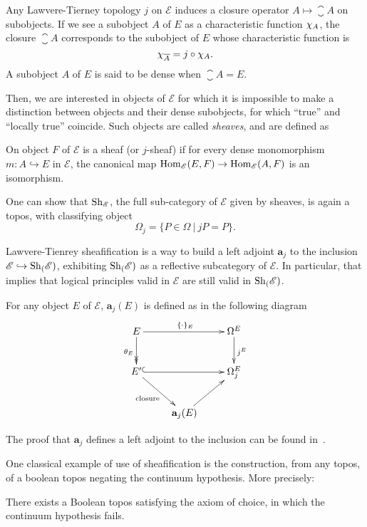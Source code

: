 Any Lawvere-Tierney topology $j$ on $\mathcal E$ induces a closure operator
$A \mapsto \closure{A}$ on subobjects. If we see a subobject $A$ of $E$
as a characteristic function $\chi_{A}$, the closure $\closure{A}$
corresponds to the subobject of $E$ whose characteristic function is 
%
\[
\chi_{\overline{A}} = j \circ \chi_{A}.
\]%
%
A subobject $A$ of $E$ is said to
be dense when $\closure{A} = E$.

Then, we are interested in objects of $\mathcal E$ for which it is
impossible to make a distinction between objects and their dense
subobjects, \ie{} for which ``true'' and ``locally true''
coincide. Such objects are called {\em sheaves}, and are defined as

\begin{defi}
  On object $F$ of $\mathcal E$ is a sheaf (or $j$-sheaf) if for every
  dense monomorphism $m: A \hookrightarrow E$ in $\mathcal E$, the
  canonical map $\mathrm{Hom}_{\mathcal E}(E,F) \rightarrow \mathrm{Hom}_{\mathcal E}(A,F)$ is an
isomorphism.
\end{defi}

One can show that $\mathrm{Sh}_{\mathcal E}$, the full sub-category of
$\mathcal E$ given by
sheaves, is again a topos, with classifying object
%
\[
\Omega_j = \{ P \in \Omega \ | \ j P  = P \}.
\]

Lawvere-Tienrey sheafification is a way to build a left adjoint $\mathbf{a}_j$ to the
inclusion $\mathcal E \hookrightarrow \mathrm{Sh}_{(}\mathcal E)$, exhibiting
$\mathrm{Sh}_{(}\mathcal E)$ as a reflective subcategory of $\mathcal E$. In
particular, that implies that logical principles valid in $\mathcal E$
are still valid in $\mathrm{Sh}_{(}\mathcal E)$.

For any object $E$ of $\mathcal E$, $\mathbf{a}_j(E)$ is defined as in
the following diagram
\[
  \xymatrix{ 
    E \ar[rr]^{\{\cdot\}_E} \ar@{->>}[d]_{\theta_E} && \Omega^E \ar[d]^{j^E}\\
    E' \ar@{^{(}->}[rr] \ar[dr]_{\text{closure}} && \Omega_j^E \\
    & \mathbf{a}_j(E) \ar[ur]&
  }
\]

The proof that $\mathbf a_j$ defines a left adjoint to the inclusion
can be found in~\cite{maclanemoerdijk}.

One classical example of use of sheafification is the construction,
from any topos, of a boolean topos negating the continuum
hypothesis. More precisely:

\begin{thm}
  There exists a Boolean topos satisfying the axiom of choice, in
  which the continuum hypothesis fails.
\end{thm}

